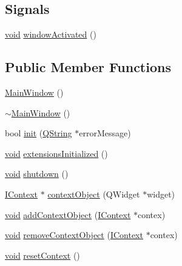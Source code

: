 \subsection*{\-Signals}
\begin{DoxyCompactItemize}
\item 
\hyperlink{group___u_a_v_objects_plugin_ga444cf2ff3f0ecbe028adce838d373f5c}{void} \hyperlink{group___core_plugin_gab85c6e89d3a93fa49b4210217ee55271}{window\-Activated} ()
\end{DoxyCompactItemize}
\subsection*{\-Public \-Member \-Functions}
\begin{DoxyCompactItemize}
\item 
\hyperlink{group___core_plugin_ga34c4b4207b46d11a4100c9b19f0e81bb}{\-Main\-Window} ()
\item 
\hyperlink{group___core_plugin_gae98d00a93bc118200eeef9f9bba1dba7}{$\sim$\-Main\-Window} ()
\item 
bool \hyperlink{group___core_plugin_gafd7a49e5ef33d7eb47ac7befd1acaeb5}{init} (\hyperlink{group___u_a_v_objects_plugin_gab9d252f49c333c94a72f97ce3105a32d}{\-Q\-String} $\ast$error\-Message)
\item 
\hyperlink{group___u_a_v_objects_plugin_ga444cf2ff3f0ecbe028adce838d373f5c}{void} \hyperlink{group___core_plugin_ga4c8ca3dfbbec662f91c1fd39467eb8ee}{extensions\-Initialized} ()
\item 
\hyperlink{group___u_a_v_objects_plugin_ga444cf2ff3f0ecbe028adce838d373f5c}{void} \hyperlink{group___core_plugin_ga1fcbdef10ebfdec100d2d0078abb5afa}{shutdown} ()
\item 
\hyperlink{class_core_1_1_i_context}{\-I\-Context} $\ast$ \hyperlink{group___core_plugin_gac1345c7f33f14242e6b865e1c72426a9}{context\-Object} (\-Q\-Widget $\ast$widget)
\item 
\hyperlink{group___u_a_v_objects_plugin_ga444cf2ff3f0ecbe028adce838d373f5c}{void} \hyperlink{group___core_plugin_gada7d20cb1e2117aa2991afa0589bdfbf}{add\-Context\-Object} (\hyperlink{class_core_1_1_i_context}{\-I\-Context} $\ast$contex)
\item 
\hyperlink{group___u_a_v_objects_plugin_ga444cf2ff3f0ecbe028adce838d373f5c}{void} \hyperlink{group___core_plugin_gad67194baca34bebd58c0d57847a8d576}{remove\-Context\-Object} (\hyperlink{class_core_1_1_i_context}{\-I\-Context} $\ast$contex)
\item 
\hyperlink{group___u_a_v_objects_plugin_ga444cf2ff3f0ecbe028adce838d373f5c}{void} \hyperlink{group___core_plugin_ga8dffd013e2adedc8c0b8700def6786f9}{reset\-Context} ()

\end{DoxyCompactItemize}
